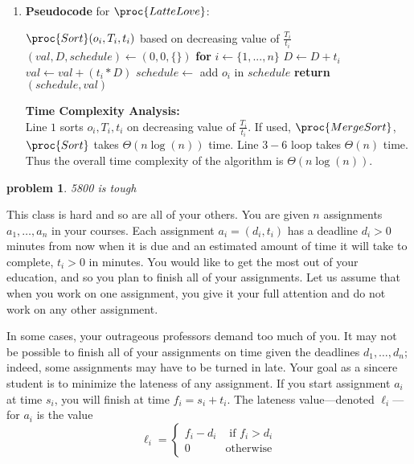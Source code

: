 \documentclass[11pt]{article}
\newtheorem{problem}{\sc\color{cit}problem}
\begin{document}
\begin{enumerate}
    Let $S^*$ be the optimal schedule that follows $S_R$ till 0 indexes. Let $S_1$ follow $S_R$ on 1 order, $S_2$ follow $S_R$ on 2 orders, ... $S_n$ follow $S_R$ on $n$ orders which is the schedule $S_R$ itself. Based on the above lemma we have:
    $$Val(S^*) \leq Val(S_1) \leq Val(S_2) \leq ... \leq Val(S_n) (= Val(S_R))$$
    Since $S^*$ is optimal, we have all of the above values equal and hence $S_R$ is optimal.
    \newpage
    \item     \textbf{Pseudocode} for $\proc{LatteLove}$:
        \begin{codebox}
        \li $\proc{Sort}(o_i,T_i,t_i)$ based on decreasing value of $\frac{T_i}{t_i}$
        \li $(val, D, schedule) \leftarrow (0,0, \{\})$
        \li \textbf{for} $i \leftarrow \{1, ..., n\}$
        \li \quad $D \leftarrow D+t_i$
        \li \quad $val \leftarrow val+(t_i*D)$
        \li \quad $schedule \leftarrow$ add $o_i$ in $schedule$
        \li \textbf{return} $(schedule, val)$
        \end{codebox}
    
    \textbf{Time Complexity Analysis:}\\
    Line $1$ sorts $o_i, T_i, t_i$ on decreasing value of $\frac{T_i}{t_i}$. If used, $\proc{MergeSort}$, $\proc{Sort}$ takes $\Theta(n\log(n))$ time. Line $3-6$ loop takes $\Theta(n)$ time.
    Thus the overall time complexity of the algorithm is $\Theta(n\log(n))$.
\end{enumerate}
    

\newpage



\begin{problem}{5800 is tough}\label{lastproblem}\end{problem}
This class is hard and so are all of your others.  You are given $n$ assignments $a_1,\ldots,a_n$ in your courses.
Each assignment $a_i=(d_{i},t_{i})$ has a deadline $d_i > 0$ minutes from now when it is due and an estimated amount
of time it will take to complete, $t_i > 0$ in minutes.  You would like to get the most out of your education, and so you plan to finish all of your assignments.   Let us assume that when you work on one assignment, you give it your full attention and do not work on any other assignment.

In some cases, your outrageous professors demand too much of you.  It may not be possible to finish all of your assignments on time given the deadlines $d_1,\ldots,d_n$; indeed, some assignments
may have to be turned in late.  Your goal as a sincere
student is to minimize the lateness of any assignment.
If you start assignment $a_i$ at time $s_i$, you will finish at time $f_i=s_i + t_i$.  
The lateness value---denoted $\ell_i$---for $a_i$ is the value
$$ \ell_i = \left\{ \begin{array}{rl} f_i - d_i & \mbox{ if } f_i > d_i \\ 0 & \mbox{otherwise}\end{array}\right.$$
\end{document}
